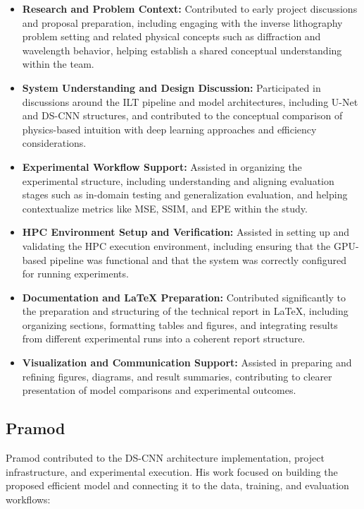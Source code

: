 \documentclass[conference]{IEEEtran}
\begin{document}
\begin{itemize}

    \item \textbf{Research and Problem Context:} Contributed to early project discussions and proposal preparation, including engaging with the inverse lithography problem setting and related physical concepts such as diffraction and wavelength behavior, helping establish a shared conceptual understanding within the team.

    \item \textbf{System Understanding and Design Discussion:} Participated in discussions around the ILT pipeline and model architectures, including U-Net and DS-CNN structures, and contributed to the conceptual comparison of physics-based intuition with deep learning approaches and efficiency considerations.

    \item \textbf{Experimental Workflow Support:} Assisted in organizing the experimental structure, including understanding and aligning evaluation stages such as in-domain testing and generalization evaluation, and helping contextualize metrics like MSE, SSIM, and EPE within the study.

    \item \textbf{HPC Environment Setup and Verification:} Assisted in setting up and validating the HPC execution environment, including ensuring that the GPU-based pipeline was functional and that the system was correctly configured for running experiments.

    \item \textbf{Documentation and LaTeX Preparation:} Contributed significantly to the preparation and structuring of the technical report in LaTeX, including organizing sections, formatting tables and figures, and integrating results from different experimental runs into a coherent report structure.

    \item \textbf{Visualization and Communication Support:} Assisted in preparing and refining figures, diagrams, and result summaries, contributing to clearer presentation of model comparisons and experimental outcomes.

\end{itemize}

\subsection{\textbf{Pramod}}
Pramod contributed to the DS-CNN architecture implementation, project infrastructure, and experimental execution. His work focused on building the proposed efficient model and connecting it to the data, training, and evaluation workflows:
\end{document}
